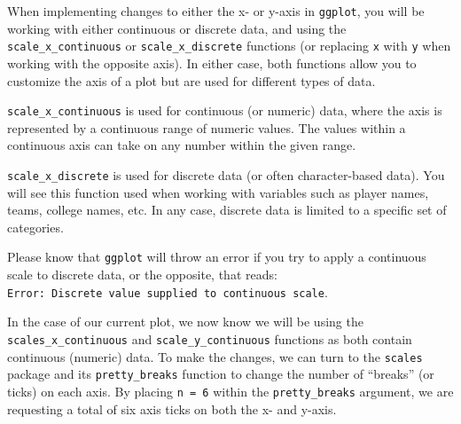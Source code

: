 \documentclass[
  letterpaper,
]{krantz}
\begin{document}
\begin{tcolorbox}[enhanced jigsaw, left=2mm, toprule=.15mm, opacitybacktitle=0.6, leftrule=.75mm, bottomrule=.15mm, colbacktitle=quarto-callout-important-color!10!white, breakable, colback=white, bottomtitle=1mm, toptitle=1mm, title=\textcolor{quarto-callout-important-color}{\faExclamation}\hspace{0.5em}{Important}, coltitle=black, titlerule=0mm, arc=.35mm, opacityback=0, colframe=quarto-callout-important-color-frame, rightrule=.15mm]

When implementing changes to either the x- or y-axis in \texttt{ggplot},
you will be working with either continuous or discrete data, and using
the \texttt{scale\_x\_continuous} or \texttt{scale\_x\_discrete}
functions (or replacing \texttt{x} with \texttt{y} when working with the
opposite axis). In either case, both functions allow you to customize
the axis of a plot but are used for different types of data.

\texttt{scale\_x\_continuous} is used for continuous (or numeric) data,
where the axis is represented by a continuous range of numeric values.
The values within a continuous axis can take on any number within the
given range.

\texttt{scale\_x\_discrete} is used for discrete data (or often
character-based data). You will see this function used when working with
variables such as player names, teams, college names, etc. In any case,
discrete data is limited to a specific set of categories.

Please know that \texttt{ggplot} will throw an error if you try to apply
a continuous scale to discrete data, or the opposite, that reads:
\texttt{Error:\ Discrete\ value\ supplied\ to\ continuous\ scale}.

\end{tcolorbox}

In the case of our current plot, we now know we will be using the
\texttt{scales\_x\_continuous} and \texttt{scale\_y\_continuous}
functions as both contain continuous (numeric) data. To make the
changes, we can turn to the \texttt{scales} package and its
\texttt{pretty\_breaks} function to change the number of ``breaks'' (or
ticks) on each axis. By placing \texttt{n\ =\ 6} within the
\texttt{pretty\_breaks} argument, we are requesting a total of six axis
ticks on both the x- and y-axis.
\end{document}
